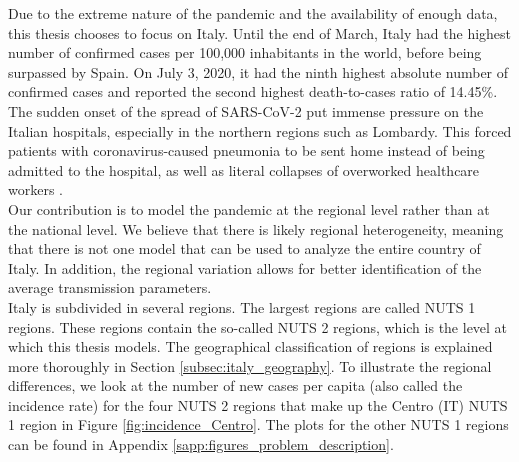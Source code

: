 \documentclass[12pt]{article}
\begin{document}
	Due to the extreme nature of the pandemic and the availability of enough data, this thesis chooses to focus on Italy. %
	Until the end of March, Italy had the highest number of confirmed cases per 100,000 inhabitants in the world, before being surpassed by Spain. On July 3, 2020, it had the ninth highest absolute number of confirmed cases %
	and reported the second highest death-to-cases ratio of 14.45\%. %
	The sudden onset of the spread of SARS-CoV-2 put immense pressure on the Italian hospitals, especially in the northern regions such as Lombardy. This forced patients with coronavirus-caused pneumonia to be sent home instead of being admitted to the hospital, as well as literal collapses of overworked healthcare workers \parencite{horowitz2020healthcare}. %
	\\
	
    Our contribution is to model the pandemic at the regional level rather than at the national level. %
    We believe that there is likely regional heterogeneity, meaning that there is not one model that can be used to analyze the entire country of Italy. %
    In addition, the regional variation allows for better identification of the average transmission parameters.  \\
    
    Italy is subdivided in several regions. The largest regions are called NUTS 1 regions. These regions contain the so-called NUTS 2 regions, which is the level at which this thesis models. The geographical classification of regions is explained more thoroughly in Section \ref{subsec:italy_geography}. To illustrate the regional differences, we look at the number of new cases per capita (also called the incidence rate) for the four NUTS 2 regions that make up the Centro (IT) NUTS 1 region in Figure \ref{fig:incidence_Centro}. The plots for the other NUTS 1 regions can be found in Appendix \ref{sapp:figures_problem_description}.
    
\end{document}
